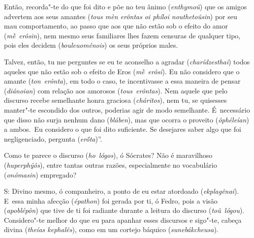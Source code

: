 Então, recorda"-te do que foi dito e põe no teu ânimo (\emph{enthymoû})
que os amigos advertem aos seus amantes (\emph{tous mèn erôntas oi
phíloi nouthetoûsin}) por seu mau comportamento, ao passo que aos que
não estão sob o efeito do amor (\emph{mḕ}~\emph{erôsin}), nem mesmo seus
familiares lhes fazem censuras de qualquer tipo, pois eles decidem
(\emph{bouleuoménois}) os seus próprios males.

Talvez, então, tu me perguntes se eu te aconselho a agradar
(\emph{charídzesthai}) todos aqueles que não estão sob o efeito de Eros
(\emph{mḕ}~\emph{erôsi}). Eu não considero que o amante
(\emph{ton}~\emph{erônta}), em todo o caso, te incentivasse a essa
maneira de pensar (\emph{diánoian}) com relação aos amorosos
(\emph{tous}~\emph{erôntas}). \bekker{[234c]} Nem aquele que pelo discurso
recebe semelhante honra graciosa (\emph{cháritos}), nem tu, se quisesses
manter"-te escondido dos outros, poderias agir de modo semelhante. É~necessário que disso não surja nenhum dano (\emph{bláben}), mas que
ocorra o proveito (\emph{ôphéleían}) a ambos.~Eu considero o que foi
dito suficiente. Se desejares saber algo que foi negligenciado, pergunta
(\emph{erṓta})''.


Como te parece o discurso (\emph{ho}~\emph{lógos}), ó Sócrates? Não é
maravilhoso (\emph{huperphýôs}), entre tantas outras razões,
especialmente no vocabulário (\emph{onómasin}) empregado?

\bekker{[234d]} S: Divino mesmo, ó companheiro, a ponto de eu estar atordoado
(\emph{ekplagênai}). E~essa minha afecção (\emph{épathon}) foi gerada
por ti, ó Fedro, pois a visão (\emph{apoblépôn}) que tive de ti foi
radiante durante a leitura do discurso (\emph{toû}~\emph{lógou}).
Considero"-te melhor do que eu para apanhar esses discursos e sigo"-te,
cabeça divina (\emph{theías kephalês}), como em um cortejo báquico
(\emph{sunebákcheusa}).

